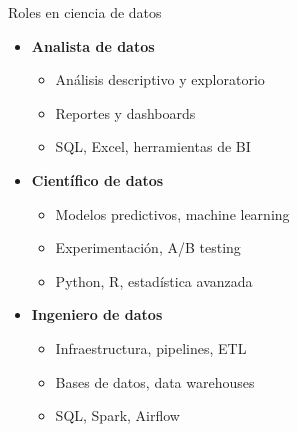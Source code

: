 \documentclass{beamer}
\begin{document}
\begin{frame}{Roles en ciencia de datos}
\begin{itemize}
    \item \textbf{Analista de datos}
    \begin{itemize}
        \item Análisis descriptivo y exploratorio
        \item Reportes y dashboards
        \item SQL, Excel, herramientas de BI
    \end{itemize}
    
    \item \textbf{Científico de datos}
    \begin{itemize}
        \item Modelos predictivos, machine learning
        \item Experimentación, A/B testing
        \item Python, R, estadística avanzada
    \end{itemize}
    
    \item \textbf{Ingeniero de datos}
    \begin{itemize}
        \item Infraestructura, pipelines, ETL
        \item Bases de datos, data warehouses
        \item SQL, Spark, Airflow
    \end{itemize}
\end{itemize}
\end{frame}
\end{document}
